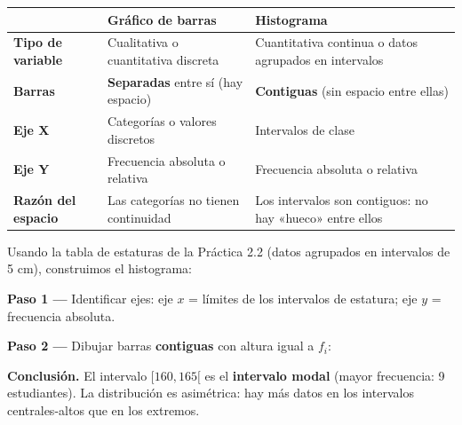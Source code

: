 \documentclass[11pt, letterpaper]{article}
\begin{document}
\begin{tcolorbox}[importantbox, title={Gráfico de barras vs. Histograma}]
\begin{center}
\renewcommand{\arraystretch}{1.35}
\begin{tabular}{p{3.2cm} p{4.2cm} p{4.2cm}}
\toprule
 & \textbf{Gráfico de barras} & \textbf{Histograma}\\
\midrule
\textbf{Tipo de variable} & Cualitativa o cuantitativa discreta & Cuantitativa continua o datos agrupados en intervalos\\
\textbf{Barras} & \textbf{Separadas} entre sí (hay espacio) & \textbf{Contiguas} (sin espacio entre ellas)\\
\textbf{Eje X} & Categorías o valores discretos & Intervalos de clase\\
\textbf{Eje Y} & Frecuencia absoluta o relativa & Frecuencia absoluta o relativa\\
\textbf{Razón del espacio} & Las categorías no tienen continuidad & Los intervalos son contiguos: no hay «hueco» entre ellos\\
\bottomrule
\end{tabular}
\end{center}
\end{tcolorbox}

\begin{tcolorbox}[examplebox, title={Ej. 5. Histograma de estaturas}]
Usando la tabla de estaturas de la Práctica 2.2 (datos agrupados en intervalos de 5 cm), construimos el histograma:

\textbf{Paso 1 ---} Identificar ejes: eje $x$ = límites de los intervalos de estatura; eje $y$ = frecuencia absoluta.
\medskip

\textbf{Paso 2 ---} Dibujar barras \textbf{contiguas} con altura igual a $f_i$:

  \begin{center}
  \end{center}
\medskip

\noindent\textbf{Conclusión.} El intervalo $[160,165[$ es el \textbf{intervalo modal} (mayor frecuencia: 9 estudiantes). La distribución es asimétrica: hay más datos en los intervalos centrales-altos que en los extremos.

\end{tcolorbox}
\end{document}
